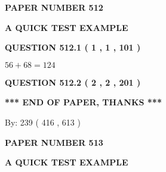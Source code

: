 \documentclass[12pt]{article}
\begin{document}
   
 {\textbf{ \Large{ PAPER NUMBER  512  }}}
   
   
\vspace{0.2in}
   
   
   
   
   
   
 \vspace{0.2in}
{\LARGE {\textbf{ A QUICK TEST EXAMPLE}}}
   
   
  
\vspace{0.2in}
  
{\textbf{\Large{QUESTION
512.1 
 ( 1 , 1 , 101 )
}}}
  
  
 
 

$ %
56 +  %
68=   %
124$
 
 
  
\vspace{0.2in}
  
{\textbf{\Large{QUESTION
512.2 
 ( 2 , 2 , 201 )
}}}
  
  
   
   
 \vspace{0.2in}
 
   
   
   
   
\vspace{1.0in} 
{\textbf{\large{ *** END OF PAPER, THANKS *** }}} 
   
   
\hspace{1.0in} By: 
 239 ( 416 ,  613 )
   
   
   
   
\newpage 
\setcounter{page}{ 
   513001 } 
   
   
   
   
 {\textbf{ \Large{ PAPER NUMBER  513  }}}
   
   
\vspace{0.2in}
   
   
   
   
   
   
 \vspace{0.2in}
{\LARGE {\textbf{ A QUICK TEST EXAMPLE}}}
   
   
  
\vspace{0.2in}
  
\end{document}
